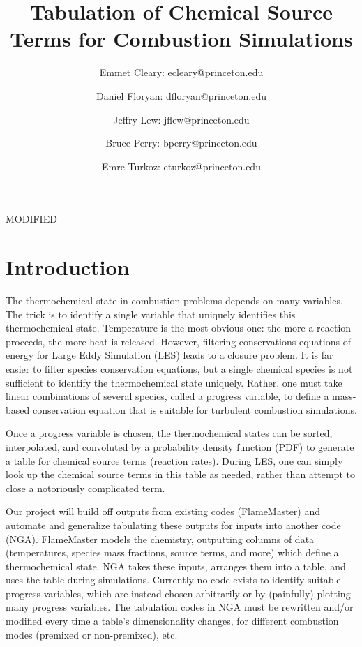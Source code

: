 \documentclass[11pt]{article}
\begin{document}
\title{\textbf{Tabulation of Chemical Source Terms for Combustion Simulations}}
\author{Emmet Cleary: ecleary@princeton.edu \and Daniel Floryan: dfloryan@princeton.edu \and Jeffry Lew: jflew@princeton.edu \and Bruce Perry: bperry@princeton.edu \and Emre Turkoz: eturkoz@princeton.edu}
\date{ } 
\maketitle

MODIFIED
\section{Introduction}

The thermochemical state in combustion problems depends on many variables. The trick is to identify a single variable that uniquely identifies this thermochemical state. Temperature is the most obvious one: the more a reaction proceeds, the more heat is released. However, filtering conservations equations of energy for Large Eddy Simulation (LES) leads to a closure problem. It is far easier to filter species conservation equations, but a single chemical species is not sufficient to identify the thermochemical state uniquely. Rather, one must take linear combinations of several species, called a progress variable, to define a mass-based conservation equation that is suitable for turbulent combustion simulations.

Once a progress variable is chosen, the thermochemical states can be sorted, interpolated, and convoluted by a probability density function (PDF) to generate a table for chemical source terms (reaction rates). During LES, one can simply look up the chemical source terms in this table as needed, rather than attempt to close a notoriously complicated term.

Our project will build off outputs from existing codes (FlameMaster) and automate and generalize tabulating these outputs for inputs into another code (NGA). FlameMaster models the chemistry, outputting columns of data (temperatures, species mass fractions, source terms, and more) which define a thermochemical state. NGA takes these inputs, arranges them into a table, and uses the table during simulations. Currently no code exists to identify suitable progress variables, which are instead chosen arbitrarily or by (painfully) plotting many progress variables. The tabulation codes in NGA must be rewritten and/or modified every time a table's dimensionality changes, for different combustion modes (premixed or non-premixed), etc.
\end{document}
